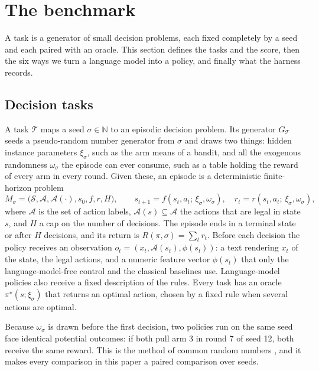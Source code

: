 \section{The \deadeye{} benchmark}
\label{sec:benchmark}

A \deadeye{} task is a generator of small decision problems, each fixed completely by a seed and each paired with an oracle. This section defines the tasks and the score, then the six ways we turn a language model into a policy, and finally what the harness records.

\subsection{Decision tasks}
\label{sec:bench:def}

A task $\mathcal{T}$ maps a seed $\sigma\in\mathbb{N}$ to an episodic decision problem. Its generator $G_{\mathcal{T}}$ seeds a pseudo-random number generator from $\sigma$ and draws two things: hidden instance parameters $\xi_\sigma$, such as the arm means of a bandit, and all the exogenous randomness $\omega_\sigma$ the episode can ever consume, such as a table holding the reward of every arm in every round. Given these, an episode is a deterministic finite-horizon problem
\begin{equation}
M_\sigma = \bigl(\mathcal{S}, \mathcal{A}, \mathcal{A}(\cdot), s_0, f, r, H\bigr), \qquad
s_{t+1} = f(s_t, a_t;\, \xi_\sigma, \omega_\sigma), \quad r_t = r(s_t, a_t;\, \xi_\sigma, \omega_\sigma),
\end{equation}
where $\mathcal{A}$ is the set of action labels, $\mathcal{A}(s)\subseteq\mathcal{A}$ the actions that are legal in state $s$, and $H$ a cap on the number of decisions. The episode ends in a terminal state or after $H$ decisions, and its return is $R(\pi,\sigma)=\sum_t r_t$. Before each decision the policy receives an observation $o_t=(x_t, \mathcal{A}(s_t), \phi(s_t))$: a text rendering $x_t$ of the state, the legal actions, and a numeric feature vector $\phi(s_t)$ that only the language-model-free control and the classical baselines use. Language-model policies also receive a fixed description of the rules. Every task has an oracle $\pi^\star(s;\xi_\sigma)$ that returns an optimal action, chosen by a fixed rule when several actions are optimal.

Because $\omega_\sigma$ is drawn before the first decision, two policies run on the same seed face identical potential outcomes: if both pull arm 3 in round 7 of seed 12, both receive the same reward. This is the method of common random numbers \citep{law2015simulation}, and it makes every comparison in this paper a paired comparison over seeds.


